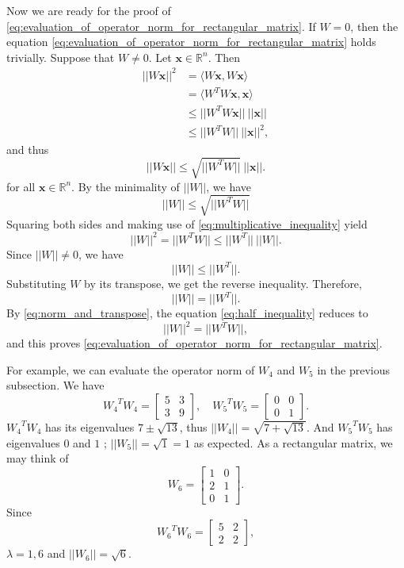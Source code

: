 \documentclass[12pt]{report}
\numberwithin{figure}{chapter}
\theoremstyle{plain}
\theoremstyle{definition}
\theoremstyle{corollary}
\theoremstyle{definition}
\theoremstyle{plain}
\theoremstyle{definition}
\theoremstyle{plain}
\newcommand\bx{\ensuremath{\boldsymbol x}}
\begin{document}
Now we are ready for the proof of \eqref{eq:evaluation_of_operator_norm_for_rectangular_matrix}.
If \(W=0\), then the equation \eqref{eq:evaluation_of_operator_norm_for_rectangular_matrix} holds trivially.
Suppose that \(W\neq0\).
Let \(\bx\in\mathbb R^n\).
Then
\begin{align*}
||W\bx||^2
&=\langle W\bx,W\bx\rangle\\
&=\langle W^TW\bx,\bx\rangle\\
&\le||W^TW\bx||\:||\bx||\\
&\le||W^TW||\:||\bx||^2,
\end{align*}
and thus
\[||W\bx||\le\sqrt{||W^TW||}\:||\bx||.\]
for all \(\bx\in\mathbb R^n\).
By the minimality of \(||W||\), we have
\[||W||\le\sqrt{||W^TW||}\]
Squaring both sides and making use of \eqref{eq:multiplicative_inequality} yield
\begin{equation}\label{eq:half_inequality}
||W||^2=||W^TW||\le||W^T||\:||W||.
\end{equation}
Since \(||W||\neq0\), we have
\[||W||\le||W^T||.\]
Substituting \(W\) by its transpose, we get the reverse inequality.
Therefore,
\begin{equation}\label{eq:norm_and_transpose}
||W||=||W^T||.
\end{equation}
By \eqref{eq:norm_and_transpose}, the equation \eqref{eq:half_inequality} reduces to
\[||W||^2=||W^TW||,\]
and this proves \eqref{eq:evaluation_of_operator_norm_for_rectangular_matrix}.

For example, we can evaluate the operator norm of \(W_4\) and \(W_5\) in the previous subsection.
We have
\[{W_4}^TW_4=\begin{bmatrix}5&3\\3&9\end{bmatrix},\quad{W_5}^TW_5=\begin{bmatrix}0&0\\0&1\end{bmatrix}.\]
\({W_4}^TW_4\) has its eigenvalues \(7\pm\sqrt{13}\), thus \(||W_4||=\sqrt{7+\sqrt{13}}\).
And \({W_5}^TW_5\) has eigenvalues \(0\) and \(1\) ; \(||W_5||=\sqrt1=1\) as expected.
As a rectangular matrix, we may think of
\[W_6=\begin{bmatrix}1&0\\2&1\\0&1\end{bmatrix}.\]
Since
\[{W_6}^TW_6=\begin{bmatrix}5&2\\2&2\end{bmatrix},\]
\(\lambda=1,6\) and \(||W_6||=\sqrt6\).
\end{document}

